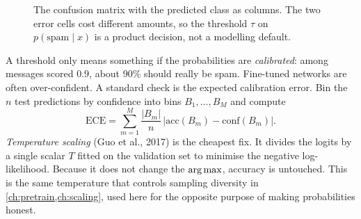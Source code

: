 \begin{figure}[ht]
\centering
{}
\caption{The confusion matrix with the predicted class as columns. The two error cells
cost different amounts, so the threshold $\tau$ on $p(\text{spam}\mid x)$ is a product
decision, not a modelling default.}
\label{fig:classify:confusion}
\end{figure}

A threshold only means something if the probabilities are \emph{calibrated}: among
messages scored $0.9$, about 90\% should really be spam. Fine-tuned networks are often
over-confident. A standard check is the expected calibration error. Bin the $n$ test
predictions by confidence into bins $B_1,\dots,B_M$ and compute
\begin{equation}
\mathrm{ECE} = \sum_{m=1}^{M}\frac{|B_m|}{n}\,\bigl|\mathrm{acc}(B_m)-\mathrm{conf}(B_m)\bigr|.
\end{equation}
\emph{Temperature scaling} (Guo et al., 2017) is the cheapest fix. It divides the logits
by a single scalar $T$ fitted on the validation set to minimise the negative
log-likelihood. Because it does not change the $\operatorname*{arg\,max}$, accuracy is untouched. This is
the same temperature that controls sampling diversity in \cref{ch:pretrain,ch:scaling},
used here for the opposite purpose of making probabilities honest.

